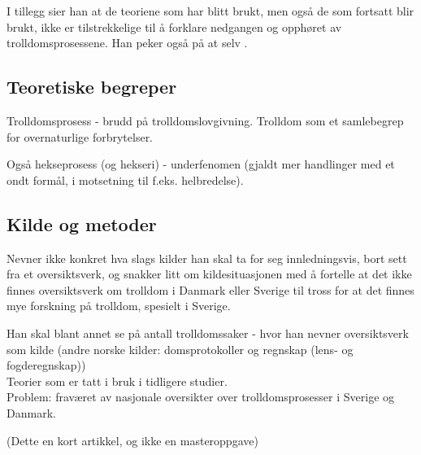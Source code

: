 \documentclass[12pt]{article}
\begin{document}

I tillegg sier han at de teoriene som har blitt brukt, men også de som fortsatt blir brukt, ikke er tilstrekkelige 
til å forklare nedgangen og opphøret av trolldomsprosessene. Han peker også på at selv .

\subsection{Teoretiske begreper}
Trolldomsprosess - brudd på trolldomslovgivning. Trolldom som et samlebegrep for overnaturlige forbrytelser.

Også hekseprosess (og hekseri) - underfenomen (gjaldt mer handlinger med et ondt formål, i motsetning til f.eks. 
helbredelse).

\subsection{Kilde og metoder}
Nevner ikke konkret hva slags kilder han skal ta for seg innledningsvis, bort sett fra et oversiktsverk, og snakker 
litt om kildesituasjonen med å fortelle at det ikke finnes oversiktsverk om trolldom i Danmark eller Sverige til 
tross for at det finnes mye forskning på trolldom, spesielt i Sverige.

Han skal blant annet se på antall trolldomssaker - hvor han nevner oversiktsverk som kilde (andre norske kilder: 
domsprotokoller og regnskap (lens- og fogderegnskap))\\
Teorier som er tatt i bruk i tidligere studier. \\
Problem: fraværet av nasjonale oversikter over trolldomsprosesser i Sverige og Danmark.

(Dette en kort artikkel, og ikke en masteroppgave)
\end{document}
